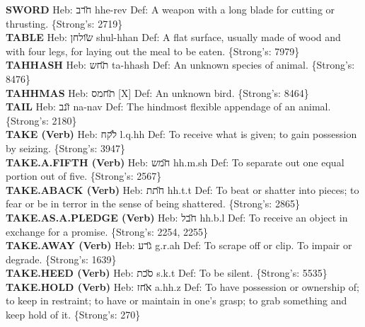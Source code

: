 {\textbf{SWORD} Heb: {\large\H חרב} hhe-rev Def: A weapon with a long blade for cutting or thrusting. \{Strong's: 2719\}\hfill{}\\

\textbf{TABLE} Heb: {\large\H שולחן} shul-hhan Def: A flat surface, usually made of wood and with four legs, for laying out the meal to be eaten. \{Strong's: 7979\}\hfill{}\\

\textbf{TAHHASH} Heb: {\large\H תחש} ta-hhash Def: An unknown species of animal. \{Strong's: 8476\}\hfill{}\\

\textbf{TAHHMAS} Heb: {\large\H תחמס} {[}X{]} Def: An unknown bird. \{Strong's: 8464\}\hfill{}\\

\textbf{TAIL} Heb: {\large\H זנב} na-nav Def: The hindmost flexible appendage of an animal. \{Strong's: 2180\}\hfill{}\\

\textbf{TAKE (Verb)} Heb: {\large\H לקח} l.q.hh Def: To receive what is given; to gain possession by seizing. \{Strong's: 3947\}\hfill{}\\

\textbf{TAKE.A.FIFTH (Verb)} Heb: {\large\H חמש} hh.m.sh Def: To separate out one equal portion out of five. \{Strong's: 2567\}\hfill{}\\

\textbf{TAKE.ABACK (Verb)} Heb: {\large\H חתת} hh.t.t Def: To beat or shatter into pieces; to fear or be in terror in the sense of being shattered. \{Strong's: 2865\}\hfill{}\\

\textbf{TAKE.AS.A.PLEDGE (Verb)} Heb: {\large\H חבל} hh.b.l Def: To receive an object in exchange for a promise. \{Strong's: 2254, 2255\}\hfill{}\\

\textbf{TAKE.AWAY (Verb)} Heb: {\large\H גרע} g.r.ah Def: To scrape off or clip. To impair or degrade. \{Strong's: 1639\}\hfill{}\\

\textbf{TAKE.HEED (Verb)} Heb: {\large\H סכת} s.k.t Def: To be silent. \{Strong's: 5535\}\hfill{}\\

\textbf{TAKE.HOLD (Verb)} Heb: {\large\H אחז} a.hh.z Def: To have possession or ownership of; to keep in restraint; to have or maintain in one's grasp; to grab something and keep hold of it. \{Strong's: 270\}\hfill{}\\

}
